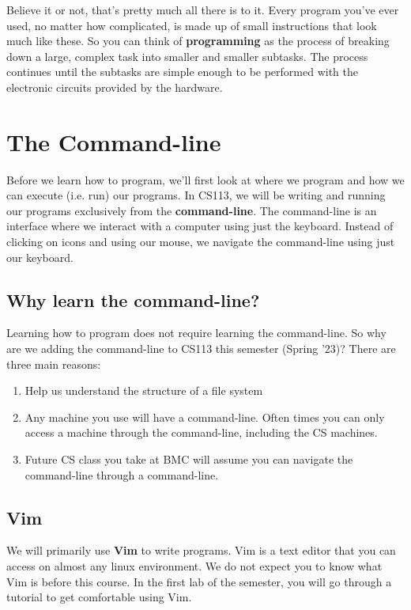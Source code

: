 Believe it or not, that's pretty much all there is to it.
Every program you've ever used, no matter how complicated, is made up of small instructions that look much like these.
So you can think of {\bf programming} as the process of breaking down a large, complex task into smaller and smaller subtasks.
The process continues until the subtasks are simple enough to be performed with the electronic circuits provided by the hardware.

\section{The Command-line}
\label{cmd-line}

Before we learn how to program, we'll first look at where we program and how we can execute (i.e. run)
our programs.
In CS113, we will be writing and running our programs exclusively from the {\bf command-line}. The command-line is an interface where we interact with a computer using just the keyboard. Instead of clicking on
icons and using our mouse, we navigate the command-line using just our keyboard.

\subsection{Why learn the command-line?}
Learning how to program does not require learning the command-line. 
So why are we adding the
command-line to CS113 this semester (Spring '23)? There are three main reasons:

\begin{enumerate}
\item Help us understand the structure of a file system
\item Any machine you use will have a command-line. Often times you can only access a machine
through the command-line, including the CS machines.
\item Future CS class you take at BMC will assume you can navigate the command-line
through a command-line.

\end{enumerate}

\subsection{Vim}
We will primarily use {\bf Vim} to write programs. Vim is a text editor
that you can access on almost any linux environment. We do not expect you to know what Vim is before
this course. In the first lab of the semester, you will go through a tutorial to get
comfortable using Vim. 

